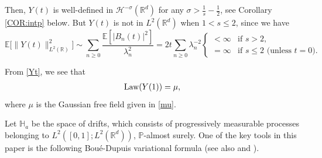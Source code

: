 \documentclass[%
11pt,  reqno]{amsart}
\theoremstyle{remarkstyle}
\newcommand{\1}{\hspace{0.2mm}\text{I}\hspace{0.2mm}}
\newcommand{\noi}{\noindent}
\newcommand{\R}{\mathbb{R}}
\let\P= \undefined
\newcommand{\P}{\mathbf{P}}
\newcommand{\E}{\mathbb{E}}
\newcommand{\ld}{\lambda}
\newcommand{\s}{\sigma}
\renewcommand{\H}{\mathcal{H}}
\numberwithin{equation}{section}
\numberwithin{theorem}{section}
\begin{document}
	\noi
	Then, 
	$Y (t)$ is well-defined in $\H^{-\s} (\R^d)$ for any $\s > \frac1s - \frac12 $, see Corollary \ref{COR:intp} below. 
	But $Y(t)$ is not in $L^2(\R^d)$ when $1 < s \le 2$, since we have
	\[
	\E \big[\|Y(t)\|_{L^2(\R)}^2\big] \sim \sum_{n\ge 0} \frac{\E [|B_n (t)|^2] }{\ld_n^2}   = 2t \sum_{n\ge 0} \ld_n^{-2}  \begin{cases}
		< \infty &\text{if } s>2, \\
		= \infty &\text{if } s\le 2 \text{ (unless } t=0).
	\end{cases}
	\]
	
	\noi
	From \eqref{Yt}, we see that
	\begin{align}
		\label{law}
		\textup{Law} (Y(1)) = \mu,
	\end{align} 
	where $\mu$ is the Gaussian free field given in \eqref{mu}.
	
	
	
	Let $\mathbb{H}_a$ be the space of drifts,
	which consists of progressively measurable processes belonging to 
	$L^2 \left([0,1]; L^2 (\R^d)\right)$,
	$\mathbb P$-almost surely.
	One of the key tools in this paper is the following Bou\'e-Dupuis variational formula \cite[Theorem 5.1]{BD98} (see also \cite{Ustunel14} and \cite{Zhang09}). 
	
\end{document}
